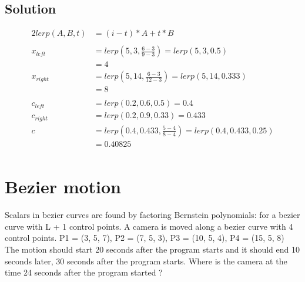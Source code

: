 \documentclass[12pt,fleqn,reqno]{article}
\begin{document}
\subsection{Solution}

\begin{alignat*}{2}
	lerp(A,B,t)	&= (i - t) * A + t * B\\
	\\
	x_{left}	&= lerp(5, 3, \frac{6-3}{9-3} )= lerp(5, 3, 0.5)\\
			&= 4\\
	x_{right}	&= lerp(5, 14, \frac{6-3}{12-3} )= lerp(5, 14, 0.333)\\
			&= 8\\
	\\
	c_{left}	&= lerp(0.2, 0.6, 0.5 ) = 0.4\\
	c_{right}	&= lerp(0.2, 0.9, 0.33 ) = 0.433\\
	c		&= lerp(0.4, 0.433, \frac{5-4}{8-4}) = lerp(0.4, 0.433, 0.25)\\
			&= 0.40825
\\
\end{alignat*}


\section{Bezier motion}
Scalars in bezier curves are found by factoring Bernstein polynomials:
for a bezier curve with L + 1 control points. A camera is moved along a bezier curve with 4 control points.
P1 = (3, 5, 7), P2 = (7, 5, 3), P3 = (10, 5, 4), P4 = (15, 5, 8)
The motion should start 20 seconds after the program starts and it should end 10 seconds later, 30 seconds after the program starts.
Where is the camera at the time 24 seconds after the program started ?
\end{document}
